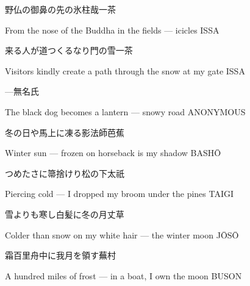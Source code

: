 \begin{haiku}
    {\FH 野仏の御鼻の先の氷柱哉}\hfill{\FH 一茶}

    \vin{} From the nose
    \vin{} \vin{} of the Buddha in the fields ---
    \vin{} \vin{} \vin{} icicles \hspace{\fill} ISSA
\end{haiku}

\begin{haiku}
    {\FH 来る人が道つくるなり門の雪}\hfill{\FH 一茶}

    \vin{} Visitors
    \vin{} \vin{} kindly create a path
    \vin{} \vin{} \vin{} through the snow at my gate \hspace{\fill} ISSA
\end{haiku}

\begin{haiku}
    {---}\hfill{\FH 無名氏}

    \vin{} The black dog
    \vin{} \vin{} becomes a lantern ---
    \vin{} \vin{} \vin{} snowy road \hspace{\fill} ANONYMOUS
\end{haiku}

\begin{haiku}
    {\FH 冬の日や馬上に凍る影法師}\hfill{\FH 芭蕉}

    \vin{} Winter sun ---
    \vin{} \vin{} frozen on horseback
    \vin{} \vin{} \vin{} is my shadow \hspace{\fill} BASH\={O}
\end{haiku}

\begin{haiku}
    {\FH つめたさに箒捨けり松の下}\hfill{\FH 太祇}

    \vin{} Piercing cold ---
    \vin{} \vin{} I dropped my broom
    \vin{} \vin{} \vin{} under the pines \hspace{\fill} TAIGI
\end{haiku}

\begin{haiku}
    {\FH 雪よりも寒し白髪に冬の月}\hfill{\FH 丈草}

    \vin{} Colder than snow
    \vin{} \vin{} on my white hair ---
    \vin{} \vin{} \vin{} the winter moon \hspace{\fill} J\={O}S\={O}
\end{haiku}

\begin{haiku}
    {\FH 霜百里舟中に我月を領す}\hfill{\FH 蕪村}

    \vin{} A hundred miles of frost ---
    \vin{} \vin{} in a boat, I own
    \vin{} \vin{} \vin{} the moon \hspace{\fill} BUSON
\end{haiku}

